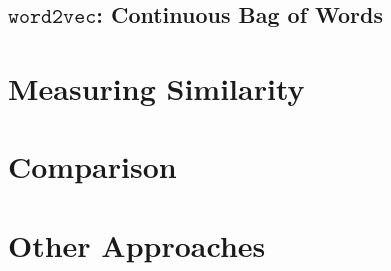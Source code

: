 \subsection{$\texttt{word2vec}$: Continuous Bag of Words}

\section{Measuring Similarity}

\section{Comparison}

\section{Other Approaches}
